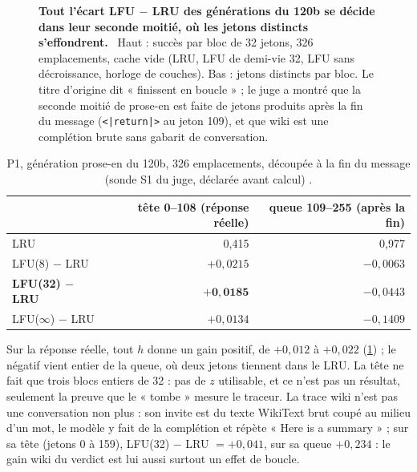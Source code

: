 \begin{figure}[tbp]
\centering
{}
\caption[P1 : succès par bloc des deux générations du 120b]{\textbf{Tout l'écart LFU $-$ LRU des générations du 120b se décide dans leur seconde moitié, où les jetons distincts s'effondrent.} \mes~Haut : succès par bloc de 32 jetons, 326 emplacements, cache vide (LRU, LFU de demi-vie 32, LFU sans décroissance, horloge de couches). Bas : jetons distincts par bloc. Le titre d'origine dit « finissent en boucle » ; le juge a montré que la seconde moitié de prose-en est faite de jetons produits après la fin du message (\texttt{<|return|>} au jeton 109), et que wiki est une complétion brute sans gabarit de conversation. \HorsStyle{}}
\label{fig:t3-mim-p1-blocs}
\end{figure}

\begin{table}[tbp]
\centering\small
\caption[P1 : la réponse réelle contre les jetons d'après la fin]{P1, génération prose-en du 120b, 326 emplacements, découpée à la fin du message (sonde S1 du juge, déclarée avant calcul) \mes.}
\label{t3mim:tab:p1-tete}
\begin{tabular}{@{}lrr@{}}
\toprule
& tête 0--108 (réponse réelle) & queue 109--255 (après la fin) \\
\midrule
LRU & 0,415 & 0,977 \\
LFU(8) $-$ LRU & $+0{,}0215$ & $-0{,}0063$ \\
\textbf{LFU(32) $-$ LRU} & $\mathbf{+0{,}0185}$ & $-0{,}0443$ \\
LFU($\infty$) $-$ LRU & $+0{,}0134$ & $-0{,}1409$ \\
\bottomrule
\end{tabular}
\end{table}

Sur la réponse réelle, tout $h$ donne un gain positif, de $+0{,}012$ à $+0{,}022$ (\cref{t3mim:tab:p1-tete}) ; le négatif vient entier de la queue, où deux jetons tiennent dans le LRU. La tête ne fait que trois blocs entiers de 32 : pas de $z$ utilisable, et ce n'est pas un résultat, seulement la preuve que le « tombe » mesure le traceur. La trace wiki n'est pas une conversation non plus : son invite est du texte WikiText brut coupé au milieu d'un mot, le modèle y fait de la complétion et répète « Here is a summary » ; sur sa tête (jetons 0 à 159), LFU(32) $-$ LRU $= +0{,}041$, sur sa queue $+0{,}234$ \mes : le gain wiki du verdict est lui aussi surtout un effet de boucle.

